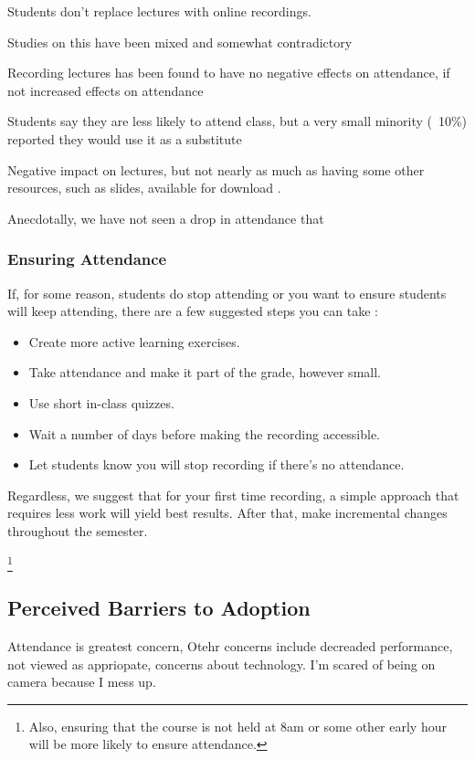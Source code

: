 \documentclass[sigconf]{acmart}
\begin{document}
Students don't replace lectures with online recordings.\cite{larkin2010but}

Studies on this have been mixed and somewhat contradictory \cite{bos2016use}


Recording lectures has been found to have no negative effects on attendance, if not increased effects on attendance \cite{shimoff2001effects}


Students say they are less likely to attend class, but a very small minority (~10\%) reported they would use it as a substitute \cite{maynor2013student}

Negative impact on lectures, but not nearly as much as having some other resources, such as slides, available for download 
\cite{traphagan2010impact}.

Anecdotally, we have not seen a drop in attendance that 

\subsubsection{Ensuring Attendance}
If, for some reason, students do stop attending or you want to ensure students will keep attending, there are a few suggested steps you can take \cite{larkin2010but} \cite{young2008lectures}:
\begin{itemize}
	\item Create more active learning exercises.
	
	\item Take attendance and make it part of the grade, however small.
	\item Use short in-class quizzes.
	\item Wait a number of days before making the recording accessible.
	\item Let students know you will stop recording if there's no attendance. 
\end{itemize}

Regardless, we suggest that for your first time recording, a simple approach that requires less work will yield best results.  
After that, make incremental changes throughout the semester.

\footnote{Also, ensuring that the course is not held at 8am or some other early hour will be more likely to ensure attendance.}

\subsection{Perceived Barriers to Adoption}
Attendance is greatest concern,\cite{maynor2013student}
Otehr concerns include decreaded performance, not viewed as appriopate, concerns about technology.\cite{maynor2013student}
I'm scared of being on camera because I mess up.
\end{document}
